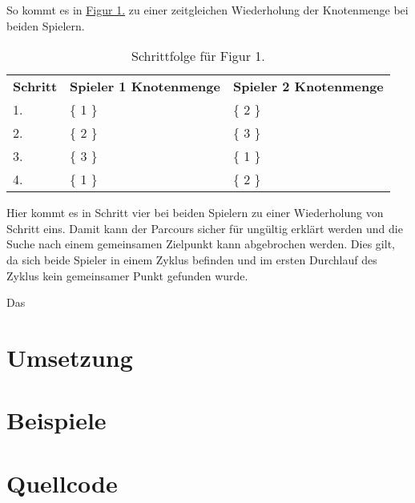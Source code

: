\documentclass[a4paper,10pt,ngerman]{scrartcl}
\begin{document}
    So kommt es in \hyperref[fig:Figure1]{Figur 1.} zu einer zeitgleichen Wiederholung der Knotenmenge bei beiden Spielern.
    
    \begin{table}
    \centering
    \begin{tabular}{lll}
    \textbf{Schritt} & \textbf{Spieler 1 Knotenmenge} & \textbf{Spieler 2 Knotenmenge} \\
    1. & \{ 1 \} & \{ 2 \} \\
    2. & \{ 2 \} & \{ 3 \} \\
    3. & \{ 3 \} & \{ 1 \} \\
    4. & \{ 1 \} & \{ 2 \} \\
    \end{tabular}
    \caption{Schrittfolge für Figur 1.}
    \label{tab:Table1}
    \end{table}
    
    Hier kommt es in Schritt vier bei beiden Spielern zu einer Wiederholung von Schritt eins.
    Damit kann der Parcours sicher für ungültig erklärt werden und die Suche nach einem gemeinsamen Zielpunkt kann abgebrochen werden.
    Dies gilt, da sich beide Spieler in einem Zyklus befinden und im ersten Durchlauf des Zyklus kein gemeinsamer Punkt gefunden wurde.
    
    Das %
    



    \section{Umsetzung}\label{sec:umsetzung}


    \section{Beispiele}\label{sec:beispiele}


    \section{Quellcode}\label{sec:quellcode}\label{LastPage}
\end{document}
